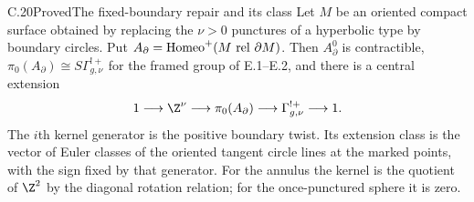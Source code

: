 \begin{claim}{C.20}{Proved}{The fixed-boundary repair and its class}
Let $M$ be an oriented compact surface obtained by replacing the
$\nu>0$ punctures of a hyperbolic type by boundary circles. Put
$A_\partial=\operatorname{Homeo}^+(M\ {\rm rel}\ \partial M)$.
Then $A_\partial^0$ is contractible,
$\pi_0(A_\partial)\cong S\Gamma^{!+}_{g,\nu}$ for the framed group
of E.1--E.2, and there is a central extension
\[
 1\longrightarrow\Z^\nu\longrightarrow\pi_0(A_\partial)
 \longrightarrow\Gamma^{!+}_{g,\nu}\longrightarrow1.
\]
The $i$th kernel generator is the positive boundary twist. Its
extension class is the vector of Euler classes of the oriented tangent
circle lines at the marked points, with the sign fixed by that generator.
For the annulus the kernel is the quotient of $\Z^2$ by the diagonal
rotation relation; for the once-punctured sphere it is zero.
\end{claim}
